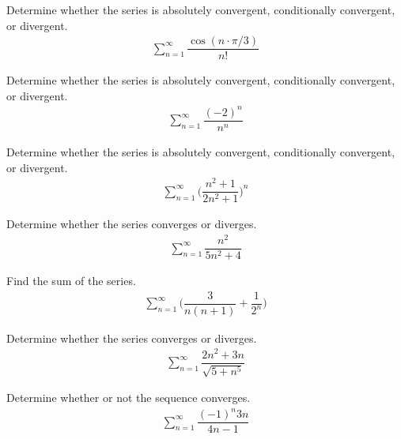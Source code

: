 \begin{exercise}
Determine whether the series is absolutely convergent, conditionally convergent, or divergent.
\begin{align*}
    \sum_{n=1}^{\infty} \dfrac{\cos(n\cdot\pi/3)}{n!}
\end{align*}
\end{exercise}

\begin{exercise}
Determine whether the series is absolutely convergent, conditionally convergent, or divergent.
\begin{align*}
    \sum_{n=1}^{\infty} \dfrac{(-2)^{n}}{n^{n}}
\end{align*}
\end{exercise}

\begin{exercise}
Determine whether the series is absolutely convergent, conditionally convergent, or divergent.
\begin{align*}
    \sum_{n=1}^{\infty} \Big(\dfrac{n^{2} + 1}{2n^{2} + 1}\Big)^{n}
\end{align*}
\end{exercise}

\begin{exercise}
Determine whether the series converges or diverges.
\begin{align*}
    \sum_{n=1}^{\infty} \dfrac{n^{2}}{5n^{2} + 4}
\end{align*}
\end{exercise}

\begin{exercise}
Find the sum of the series.
\begin{align*}
\sum_{n=1}^{\infty} \Big(\dfrac{3}{n(n+1)} + \dfrac{1}{2^{n}}\Big)
\end{align*}
\end{exercise}

\begin{exercise}
Determine whether the series converges or diverges.
\begin{align*}
    \sum_{n=1}^{\infty} \dfrac{2n^{2} + 3n}{\sqrt{5 + n^{5}}}
\end{align*}
\end{exercise}

\begin{exercise}
Determine whether or not the sequence converges.
\begin{align*}
    \sum_{n=1}^{\infty} \dfrac{(-1)^{n} 3n}{4n - 1}
\end{align*}
\end{exercise}

